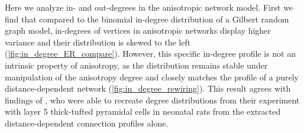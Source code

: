 Here we analyze in- and out-degrees in the anisotropic network
model. First we find that compared to the binomial in-degree
distribution of a Gilbert random graph model, in-degrees of vertices
in anisotropic networks display higher variance and their distribution
is skewed to the left (\autoref{fig:in_degree_ER_compare}). However,
this specific in-degree profile is not an intrinsic property of
anisotropy, as the distribution remains stable under manipulation of
the anisotropy degree and closely matches the profile of a purely
distance-dependent network (\autoref{fig:in_degree_rewiring}). This
result agrees with findings of \textcite[Fig. S3]{Perin2011}, who were
able to recreate degree distributions from their experiment with layer
5 thick-tufted pyramidal cells in neonatal rats from the extracted
distance-dependent connection profiles alone.

